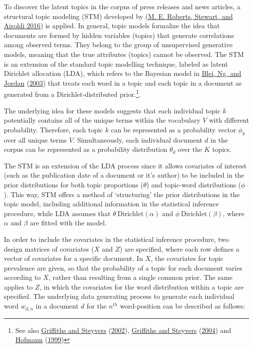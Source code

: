 \documentclass[
]{article}
\begin{document}
To discover the latent topics in the corpus of press releases and news
articles, a structural topic modeling (STM) developed by
(\protect\hyperlink{ref-roberts_model_2016}{M. E. Roberts, Stewart, and
Airoldi 2016}) is applied. In general, topic models formalize the idea
that documents are formed by hidden variables (topics) that generate
correlations among observed terms. They belong to the group of
unsupervised generative models, meaning that the true attributes
(topics) cannot be observed. The STM is an extension of the standard
topic modelling technique, labeled as latent Dirichlet allocation (LDA),
which refers to the Bayesian model in
\protect\hyperlink{ref-blei_latent_2003}{Blei, Ng, and Jordan}
(\protect\hyperlink{ref-blei_latent_2003}{2003}) that treats each word
in a topic and each topic in a document as generated from a
Dirichlet-distributed prior.\footnote{See also
  \protect\hyperlink{ref-griffiths_probabilistic_2002}{Griffiths and
  Steyvers}
  (\protect\hyperlink{ref-griffiths_probabilistic_2002}{2002}),
  \protect\hyperlink{ref-griffiths_finding_2004}{Griffiths and Steyvers}
  (\protect\hyperlink{ref-griffiths_finding_2004}{2004}) and
  \protect\hyperlink{ref-hofmann_probabilistic_1999}{Hofmann}
  (\protect\hyperlink{ref-hofmann_probabilistic_1999}{1999})}.

The underlying idea for these models suggests that each individual topic
\(k\) potentially contains all of the unique terms within the vocabulary
\(V\) with different probability. Therefore, each topic \(k\) can be
represented as a probability vector \(\phi_k\) over all unique terms
\(V\). Simultaneously, each individual document \(d\) in the corpus can
be represented as a probability distribution \(\theta_d\) over the \(K\)
topics.

The STM is an extension of the LDA process since it allows covariates of
interest (such as the publication date of a document or it's author) to
be included in the prior distributions for both topic proportions
(\(\theta\)) and topic-word distributions (\(\phi\)). This way, STM
offers a method of `structuring' the prior distributions in the topic
model, including additional information in the statistical inference
procedure, while LDA assumes that \(\theta ~ \text{Dirichlet}(\alpha)\)
and \(\phi ~ \text{Dirichlet}(\beta)\), where \(\alpha\) and \(\beta\)
are fitted with the model.

In order to include the covariates in the statistical inference
procedure, two design matrices of covariates (\(X\) and \(Z\)) are
specified, where each row defines a vector of covariates for a specific
document. In \(X\), the covariates for topic prevalence are given, so
that the probability of a topic for each document varies according to
\(X\), rather than resulting from a single common prior. The same
applies to \(Z\), in which the covariates for the word distribution
within a topic are specified. The underlying data generating process to
generate each individual word \(w_{d,n}\) in a document \(d\) for the
\(n^{th}\) word-position can be described as follows:
\end{document}
